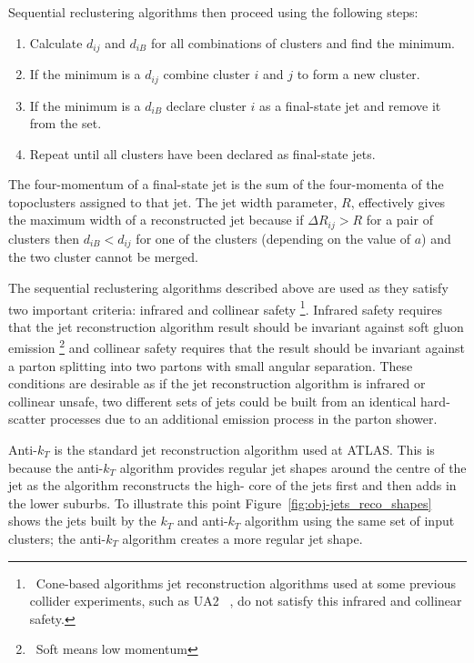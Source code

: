 \noindent Sequential reclustering algorithms then proceed using the following steps:
\vspace{-0.5em}
\begin{enumerate}[nolistsep,leftmargin=*]
  \item Calculate $d_{ij}$ and $d_{iB}$ for all combinations of clusters and find the minimum.
  \item If the minimum is a $d_{ij}$ combine cluster $i$ and $j$ to form a new cluster. 
  \item If the minimum is a $d_{iB}$ declare cluster $i$ as a final-state jet and remove it from the set.  
  \item Repeat until all clusters have been declared as final-state jets. 
\end{enumerate} 

The four-momentum of a final-state jet is the sum of the four-momenta of the topoclusters assigned to that jet.
The jet width parameter, $R$, effectively gives the maximum width of a reconstructed jet
because if $\Delta R_{ij} > R$  for a pair of clusters then
$d_{iB} < d_{ij}$ for one of the clusters (depending on the value of $a$) and the two cluster cannot be merged.

The sequential reclustering algorithms described above are used as they satisfy two important %
criteria: infrared and collinear safety \footnote{\ Cone-based algorithms jet reconstruction algorithms used at some previous collider experiments,
  such as UA2 ~\cite{obj-jets_reco_UA2}, do not satisfy this infrared and collinear safety.}.
Infrared safety requires that the jet reconstruction algorithm result should be invariant against soft gluon emission \footnote{\ Soft means low momentum}
and collinear safety requires that the result should be invariant against a parton splitting into two partons with small angular separation.
These conditions are desirable as if the jet reconstruction algorithm is infrared or collinear unsafe,
two different sets of jets could be built from an identical hard-scatter processes
due to an additional emission process in the parton shower.

Anti-$k_T$ is the standard jet reconstruction algorithm used at ATLAS. %
This is because the anti-$k_T$ algorithm provides regular jet shapes around the centre of the jet as
the algorithm reconstructs the high-\pT{} core of the jets first and then adds in the lower \pT{} suburbs. %
To illustrate this point Figure~\ref{fig:obj-jets_reco_shapes} shows the jets built by the %
$k_T$ and anti-$k_T$ algorithm using the same set of input clusters; the anti-$k_T$ algorithm creates a more regular jet shape.

